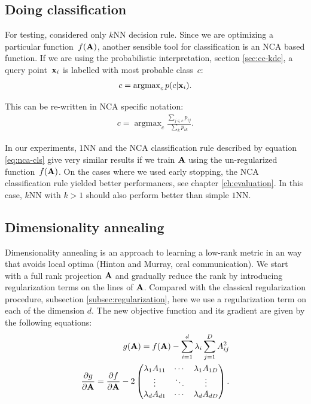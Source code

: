 \subsection{Doing classification}
\label{subsec:doing-classification}

  For testing, \citet{goldberger2004} considered only $k$NN decision rule. Since we are optimizing a particular function~$f(\mathbf{A})$, another sensible tool for classification is an NCA based function. If we are using the probabilistic interpretation, section \ref{sec:cc-kde}, a query point~$\mathbf{x}_i$ is labelled with most probable class~$c$:
  \begin{align}
     c = \operatorname{argmax}_cp(c|\mathbf{x}_i).
  \end{align}

  This can be re-written in NCA specific notation:
  \begin{align}
    c = \operatorname{argmax}_c\frac{\sum_{j\in c}p_{ij}}{\sum_k p_{ik}}.
    \label{eq:nca-cls}
  \end{align}

  In our experiments, $1$NN and the NCA classification rule described by equation \eqref{eq:nca-cls} give very similar results if we train $\mathbf{A}$ using the un-regularized function~$f(\mathbf{A})$. On the cases where we used early stopping, the NCA classification rule yielded better performances, see chapter \ref{ch:evaluation}. In this case, $k$NN with $k>1$ should also perform better than simple $1$NN.

\subsection{Dimensionality annealing}
\label{subsec:dimensionality-annealing}

  Dimensionality annealing is an approach to learning a low-rank metric in an way that avoids local optima (Hinton and Murray, oral communication). We start with a full rank projection $\mathbf{A}$ and gradually reduce the rank by introducing regularization terms on the lines of $\mathbf{A}$. Compared with the classical regularization procedure, subsection \ref{subsec:regularization}, here we use a regularization term on each of the dimension $d$. The new objective function and its gradient are given by the following equations:
    \begin{align}
            g(\mathbf{A}) = f(\mathbf{A}) - \sum_{i=1}^d\lambda_i\sum_{j=1}^D A_{ij}^2\\
            \frac{\partial g}{\partial \mathbf{A}} = \frac{\partial f}{\partial \mathbf{A}} - 2\begin{pmatrix}
                              \lambda_1A_{11} &  \cdots & \lambda_1A_{1D} \\
                              \vdots  &   \ddots & \vdots  \\
                              \lambda_dA_{d1} & \cdots & \lambda_dA_{dD}
                             \end{pmatrix}.
     \end{align}

